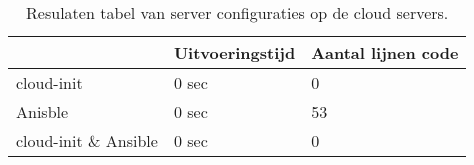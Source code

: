 \begin{table}[!htb]
	\centering
	\begin{tabular}{| l | l | l |}
		\hline
		& \textbf{Uitvoeringstijd} & \textbf{Aantal lijnen code}  \\ \hline
		cloud-init & 0 sec & 0 \\ \hline
		Anisble & 0 sec & 53 \\ \hline
		cloud-init \& Ansible & 0 sec & 0 \\
		\hline
	\end{tabular}
	\caption{Resulaten tabel van server configuraties op de cloud servers.}
	\label{tab:tabel cloud resultaten server}
\end{table}

